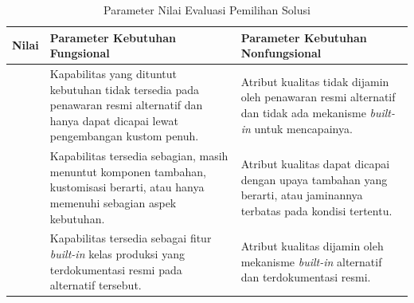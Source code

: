 \begin{table}[!htb]
\centering
\caption{Parameter Nilai Evaluasi Pemilihan Solusi}
\label{tab:rubrik_solusi}
\footnotesize
\setlength{\tabcolsep}{3pt}
\renewcommand{\arraystretch}{1.2}
\begin{tabular}{|>{\centering\arraybackslash}m{1.2cm}|>{\raggedright\arraybackslash}m{5.9cm}|>{\raggedright\arraybackslash}m{5.9cm}|}
\hline
\centering\arraybackslash\textbf{Nilai} & \centering\arraybackslash\textbf{Parameter Kebutuhan Fungsional} & \centering\arraybackslash\textbf{Parameter Kebutuhan Nonfungsional} \\
\hline
0 & Kapabilitas yang dituntut kebutuhan tidak tersedia pada penawaran resmi alternatif dan hanya dapat dicapai lewat pengembangan kustom penuh. & Atribut kualitas tidak dijamin oleh penawaran resmi alternatif dan tidak ada mekanisme \textit{built-in} untuk mencapainya. \\
\hline
1 & Kapabilitas tersedia sebagian, masih menuntut komponen tambahan, kustomisasi berarti, atau hanya memenuhi sebagian aspek kebutuhan. & Atribut kualitas dapat dicapai dengan upaya tambahan yang berarti, atau jaminannya terbatas pada kondisi tertentu. \\
\hline
2 & Kapabilitas tersedia sebagai fitur \textit{built-in} kelas produksi yang terdokumentasi resmi pada alternatif tersebut. & Atribut kualitas dijamin oleh mekanisme \textit{built-in} alternatif dan terdokumentasi resmi. \\
\hline
\end{tabular}
\end{table}
